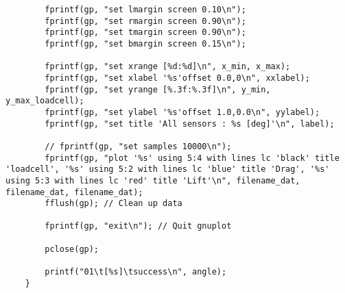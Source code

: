 \documentclass[12pt,a4paper]{jsarticle}
\begin{document}
{\begin{lstlisting}
        fprintf(gp, "set lmargin screen 0.10\n");
        fprintf(gp, "set rmargin screen 0.90\n");
        fprintf(gp, "set tmargin screen 0.90\n");
        fprintf(gp, "set bmargin screen 0.15\n");
    
        fprintf(gp, "set xrange [%d:%d]\n", x_min, x_max);
        fprintf(gp, "set xlabel '%s'offset 0.0,0\n", xxlabel);
        fprintf(gp, "set yrange [%.3f:%.3f]\n", y_min, y_max_loadcell);
        fprintf(gp, "set ylabel '%s'offset 1.0,0.0\n", yylabel);
        fprintf(gp, "set title 'All sensors : %s [deg]'\n", label);
    
        // fprintf(gp, "set samples 10000\n");
        fprintf(gp, "plot '%s' using 5:4 with lines lc 'black' title 'loadcell', '%s' using 5:2 with lines lc 'blue' title 'Drag', '%s' using 5:3 with lines lc 'red' title 'Lift'\n", filename_dat, filename_dat, filename_dat);
        fflush(gp); // Clean up data
    
        fprintf(gp, "exit\n"); // Quit gnuplot
    
        pclose(gp);
    
        printf("01\t[%s]\tsuccess\n", angle);
    }
        
\end{lstlisting}

}
\end{document}
